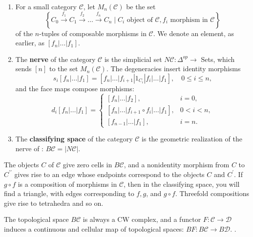 \begin{enumerate}
    \item For a small category $\mathcal{C}$, let $M_n(\mathcal{C})$ be the set
    $$
    \left\{C_0 \xrightarrow{f_1} C_1 \xrightarrow{f_2} \ldots \xrightarrow{f_n} C_n \mid C_i \text { object of } \mathcal{C}, f_i \text { morphism in } \mathcal{C}\right\}
    $$
    of the $n$-tuples of composable morphisms in $\mathcal{C}$. We denote an element, as earlier, as $\left[f_n|\ldots| f_1\right]$.
    \item The \textbf{nerve} of the category $\mathcal{C}$ is the simplicial set $N \mathcal{C}: \Delta^{o p} \rightarrow$ Sets, which sends $[n]$ to the set $M_n(\mathcal{C})$. The degeneracies insert identity morphisms
    $$
    s_i\left[f_n|\ldots| f_1\right]=\left[f_n|\ldots| f_{i+1}\left|1_{C_i}\right| f_i|\ldots| f_1\right], \quad 0 \leq i \leq n,
    $$
    and the face maps compose morphisms:
    $$
    d_i\left[f_n|\ldots| f_1\right]= \begin{cases}{\left[f_n|\ldots| f_2\right],} & i=0, \\ {\left[f_n|\ldots| f_{i+1} \circ f_i|\ldots| f_1\right],} & 0<i<n, \\ {\left[f_{n-1}|\ldots| f_1\right],} & i=n .\end{cases}
    $$
    \item The \textbf{classifying space} of the category $\mathcal{C}$ is the geometric realization of the nerve of \cc: $B \mathcal{C}=|N \mathcal{C}|$.
\end{enumerate}


The objects $C$ of $\mathcal{C}$ give zero cells in $B \mathcal{C}$, and a nonidentity morphism from $C$ to $C^{\prime \prime}$ gives rise to an edge whose endpoints correspond to the objects $C$ and $C^{\prime}$. If $g \circ f$ is a composition of morphisms in $\mathcal{C}$, then in the classifying space, you will find a triangle, with edges corresponding to $f, g$, and $g \circ f$. Threefold compositions give rise to tetrahedra and so on.

The topological space $B \mathcal{C}$ is always a $\mathrm{CW}$ complex, and a functor $F: \mathcal{C} \rightarrow \mathcal{D}$ induces a continuous and cellular map of topological spaces:
$
B F: B \mathcal{C} \rightarrow B \mathcal{D} \text {. }
$.\\

